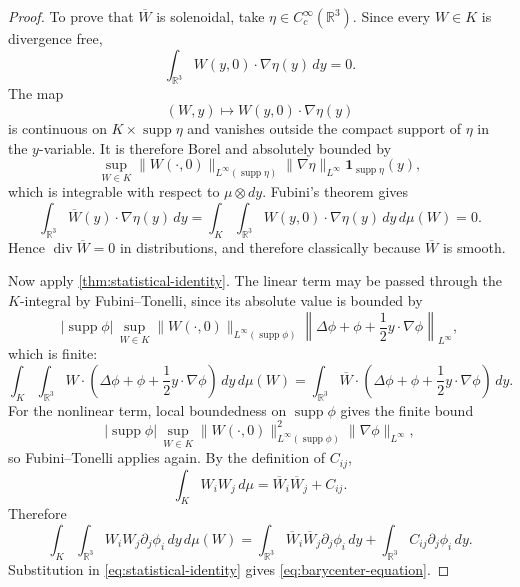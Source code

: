 \documentclass[11pt]{amsart}
\theoremstyle{plain}
\theoremstyle{definition}
\theoremstyle{remark}
\numberwithin{equation}{section}
\begin{document}
\begin{proof}
To prove that \(\overline W\) is solenoidal, take
\(\eta\in C_c^\infty(\mathbb R^3)\).  Since every \(W\in K\) is divergence
free,
\[
   \int_{\mathbb R^3}W(y,0)\cdot\nabla\eta(y)\,dy=0 .
\]
The map
\[
   (W,y)\mapsto W(y,0)\cdot\nabla\eta(y)
\]
is continuous on \(K\times\operatorname{supp}\eta\) and vanishes outside the
compact support of \(\eta\) in the \(y\)-variable.  It is therefore Borel and
absolutely bounded by
\[
   \sup_{W\in K}\|W(\cdot,0)\|_{L^\infty(\operatorname{supp}\eta)}
   \|\nabla\eta\|_{L^\infty}\mathbf 1_{\operatorname{supp}\eta}(y),
\]
which is integrable with respect to \(\mu\otimes dy\).  Fubini's theorem gives
\[
   \int_{\mathbb R^3}\overline W(y)\cdot\nabla\eta(y)\,dy
   =
   \int_K
   \int_{\mathbb R^3}W(y,0)\cdot\nabla\eta(y)\,dy\,d\mu(W)
   =
   0 .
\]
Hence \(\operatorname{div}\overline W=0\) in distributions, and therefore
classically because \(\overline W\) is smooth.

Now apply \cref{thm:statistical-identity}.  The linear term may be passed
through the \(K\)-integral by Fubini--Tonelli, since its absolute value is
bounded by
\[
   |\operatorname{supp}\phi|\,
   \sup_{W\in K}\|W(\cdot,0)\|_{L^\infty(\operatorname{supp}\phi)}
   \left\|\Delta\phi+\phi+\frac12y\cdot\nabla\phi\right\|_{L^\infty},
\]
which is finite:
\[
   \int_K\int_{\mathbb R^3}
   W\cdot\left(\Delta\phi+\phi+\frac12y\cdot\nabla\phi\right)\,dy\,d\mu(W)
   =
   \int_{\mathbb R^3}
   \overline W\cdot
   \left(\Delta\phi+\phi+\frac12y\cdot\nabla\phi\right)\,dy .
\]
For the nonlinear term, local boundedness on \(\operatorname{supp}\phi\) gives
the finite bound
\[
   |\operatorname{supp}\phi|\,
   \sup_{W\in K}\|W(\cdot,0)\|_{L^\infty(\operatorname{supp}\phi)}^2
   \|\nabla\phi\|_{L^\infty},
\]
so Fubini--Tonelli applies again.  By the definition of \(C_{ij}\),
\[
   \int_K W_iW_j\,d\mu
   =
   \overline W_i\overline W_j+C_{ij}.
\]
Therefore
\[
   \int_K\int_{\mathbb R^3}
   W_iW_j\partial_j\phi_i\,dy\,d\mu(W)
   =
   \int_{\mathbb R^3}
   \overline W_i\overline W_j\partial_j\phi_i\,dy
   +
   \int_{\mathbb R^3}
   C_{ij}\partial_j\phi_i\,dy .
\]
Substitution in \eqref{eq:statistical-identity} gives
\eqref{eq:barycenter-equation}.


\end{proof}
\end{document}
